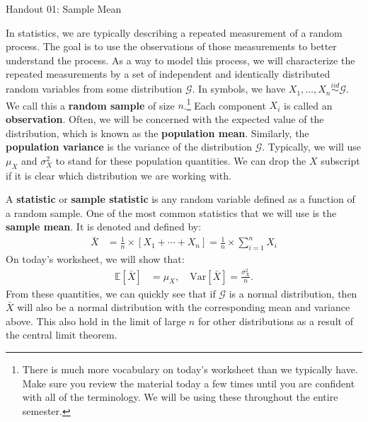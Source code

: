 \documentclass{tufte-handout}
\newcommand{\E}{\mathbb{E}}
\newcommand{\V}{\text{Var}}
\newcommand{\iid}{\stackrel{iid}{\sim}}
\begin{document}
\justify

{\LARGE Handout 01: Sample Mean}

\vspace*{18pt}

\noindent
In statistics, we are typically describing a repeated measurement of a
random process. The goal is to use the observations of those measurements to
better understand the process. As a way to model this process, we 
will characterize the repeated measurements by a set of independent and
identically distributed random variables from some distribution
$\mathcal{G}$. In symbols, we have $X_1, \ldots, X_n \iid \mathcal{G}$.
We call this a \textbf{random sample} of size $n$.\footnote{
  There is much more vocabulary on today's worksheet than we typically
  have. Make sure you review the material today a few times until you
  are confident with all of the terminology. We will be using these 
  throughout the entire semester.
}
Each component $X_i$
is called an \textbf{observation}. Often, we will be concerned with the
expected value of the distribution, which is known as the
\textbf{population mean}. Similarly, the \textbf{population variance} is
the variance of the distribution $\mathcal{G}$. Typically, we will use
$\mu_X$ and $\sigma^2_X$ to stand for these population quantities. We
can drop the $X$ subscript if it is clear which distribution we are working
with.

A \textbf{statistic} or \textbf{sample statistic} is any random variable
defined as a function of a random sample. One of the most common statistics
that we will use is the \textbf{sample mean}. It is denoted and defined by:
\begin{align*}
\bar{X} &= \frac{1}{n} \times \left[X_1 + \cdots + X_n \right] = \frac{1}{n} \times \sum_{i=1}^n X_i
\end{align*}
On today's worksheet, we will show that:
\begin{align*}
\E[\bar{X}] &= \mu_X, \quad \V[\bar{X}] = \frac{\sigma^2_X}{n}.
\end{align*}
From these quantities, we can quickly see that if $\mathcal{G}$ is a normal
distribution, then $\bar{X}$ will also be a normal distribution with the 
corresponding mean and variance above. This also hold in the limit of large
$n$ for other distributions as a result of the central limit theorem.
\end{document}
